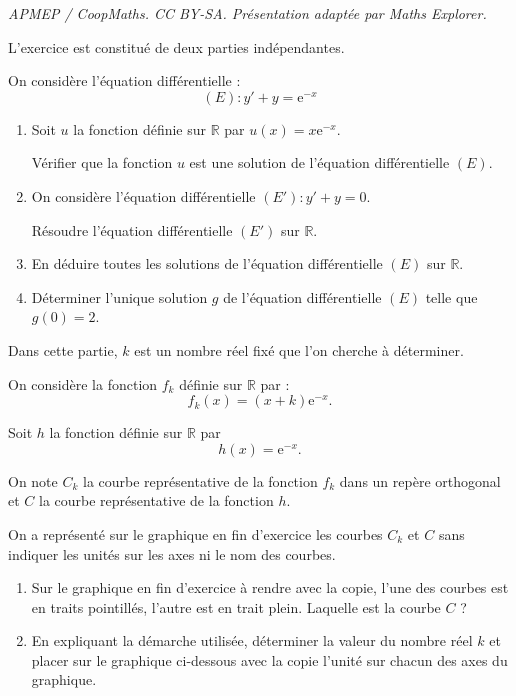 \documentclass[10pt]{article}
\providecommand{\R}{\mathbb{R}}
\providecommand{\e}{{\mathrm{e}}}
\begin{document}
\noindent\textit{APMEP / CoopMaths. CC BY-SA. Présentation adaptée par Maths Explorer.}\par\medskip
L'exercice est constitué de deux parties indépendantes.

\medskip


\medskip

On considère l'équation différentielle :
\[(E): y' + y = \e^{-x}\]

\begin{enumerate}
\item Soit $u$ la fonction définie sur $\R$ par $u(x) = x \e^{-x}$.

Vérifier que la fonction $u$ est une solution de l'équation différentielle $(E)$.
\item On considère l'équation différentielle $\left(E'\right): y' + y = 0$.

Résoudre l'équation différentielle $\left(E'\right)$ sur $\R$.

\item En déduire toutes les solutions de l'équation différentielle $(E)$ sur $\R$.

\item Déterminer l'unique solution $g$ de l'équation différentielle $(E)$ telle que $g(0) = 2$.
\end{enumerate}


\medskip


\medskip

Dans cette partie, $k$ est un nombre réel fixé que l'on cherche à déterminer.

On considère la fonction $f_{k}$ définie sur $\R$ par :
\[f_{k}(x) = (x + k) \e^{-x}.\]

Soit $h$ la fonction définie sur $\R$ par
\[h(x) = \e^{-x}.\]

On note $C_{k}$ la courbe représentative de la fonction $f_{k}$ dans un repère orthogonal et $C$ la courbe représentative de la fonction $h$.

On a représenté sur le graphique en fin d'exercice les courbes $C_{k}$ et $C$ sans indiquer les unités sur les axes ni le nom des courbes.

	\begin{enumerate}
		\item Sur le graphique en fin d'exercice à rendre avec la copie, l'une des courbes est en traits pointillés, l'autre est en trait plein. Laquelle est la courbe $C$ ?

		\item En expliquant la démarche utilisée, déterminer la valeur du nombre réel $k$ et placer sur le graphique ci-dessous avec la copie l'unité sur chacun des axes du graphique.
	\end{enumerate}
\end{document}
